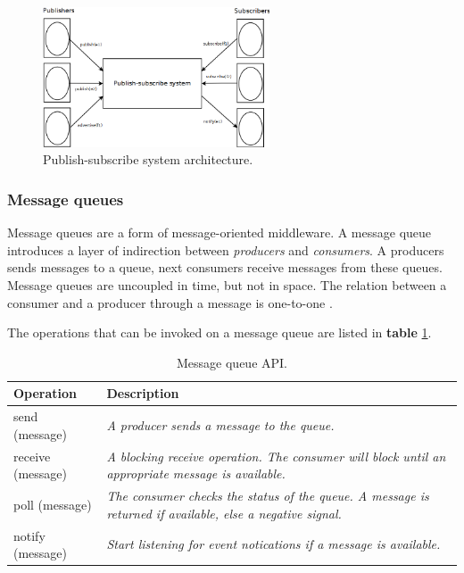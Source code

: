 \begin{figure}[h]
	\begin{center}
		\includegraphics[width=0.6\textwidth]{img/systems-and-architectures/publish-subscribesystem}
	\end{center}
	\caption{Publish-subscribe system architecture.}
	\label{fig:publish-subscribesystem}
\end{figure}




\subsubsection{Message queues}

Message queues are a form of message-oriented middleware. A message queue introduces a layer of indirection between \emph{producers} and \emph{consumers}. A producers sends messages to a queue, next consumers receive messages from these queues. Message queues are uncoupled in time, but not in space. The relation between a consumer and a producer through a message is one-to-one \cite{Coulouris:2011:DSC:2029110}.

The operations that can be invoked on a message queue are listed in \textbf{table} \ref{tab:api:messagequeues}.


\begin{table}[h]
	\caption{Message queue API.}
	\label{tab:api:messagequeues}
	\begin{tabular}{p{150px} | p{250px}}
		\textbf{Operation} & \textbf{Description} \\
		\hline
		send (message) & \emph{A producer sends a message to the queue.} \\
		receive (message) & \emph{A blocking receive operation. The consumer will block until an appropriate message is available.} \\
		poll (message) & \emph{The consumer checks the status of the queue. A message is returned if available, else a negative signal.} \\
		notify (message) & \emph{Start listening for event notications if a message is available.} \\
		\hline
	\end{tabular}
\end{table}


